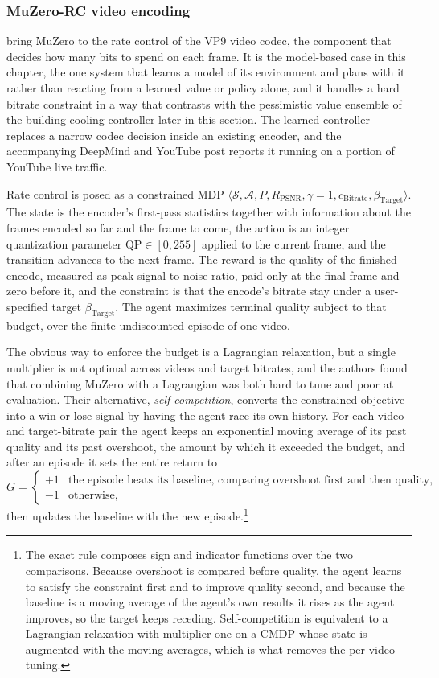 \subsubsection{MuZero-RC video encoding}
\citet{Mandhane2022MuZeroRC} bring MuZero to the rate control of the VP9 video codec, the component that decides how many bits to spend on each frame. It is the model-based case in this chapter, the one system that learns a model of its environment and plans with it rather than reacting from a learned value or policy alone, and it handles a hard bitrate constraint in a way that contrasts with the pessimistic value ensemble of the building-cooling controller later in this section. The learned controller replaces a narrow codec decision inside an existing encoder, and the accompanying DeepMind and YouTube post \citep{DeepMind2022MuZeroRCPost} reports it running on a portion of YouTube live traffic.

Rate control is posed as a constrained MDP $\langle\mathcal{S},\mathcal{A},P,R_{\mathrm{PSNR}},\gamma=1,c_{\mathrm{Bitrate}},\beta_{\mathrm{Target}}\rangle$. The state is the encoder's first-pass statistics together with information about the frames encoded so far and the frame to come, the action is an integer quantization parameter $\mathrm{QP}\in[0,255]$ applied to the current frame, and the transition advances to the next frame. The reward is the quality of the finished encode, measured as peak signal-to-noise ratio, paid only at the final frame and zero before it, and the constraint is that the encode's bitrate stay under a user-specified target $\beta_{\mathrm{Target}}$. The agent maximizes terminal quality subject to that budget, over the finite undiscounted episode of one video.

The obvious way to enforce the budget is a Lagrangian relaxation, but a single multiplier is not optimal across videos and target bitrates, and the authors found that combining MuZero with a Lagrangian was both hard to tune and poor at evaluation. Their alternative, \emph{self-competition}, converts the constrained objective into a win-or-lose signal by having the agent race its own history. For each video and target-bitrate pair the agent keeps an exponential moving average of its past quality and its past overshoot, the amount by which it exceeded the budget, and after an episode it sets the entire return to
\begin{equation}
G=\begin{cases}
+1 & \text{the episode beats its baseline, comparing overshoot first and then quality,}\\
-1 & \text{otherwise,}
\end{cases}
\end{equation}
then updates the baseline with the new episode.\footnote{The exact rule composes sign and indicator functions over the two comparisons. Because overshoot is compared before quality, the agent learns to satisfy the constraint first and to improve quality second, and because the baseline is a moving average of the agent's own results it rises as the agent improves, so the target keeps receding. Self-competition is equivalent to a Lagrangian relaxation with multiplier one on a CMDP whose state is augmented with the moving averages, which is what removes the per-video tuning.}

